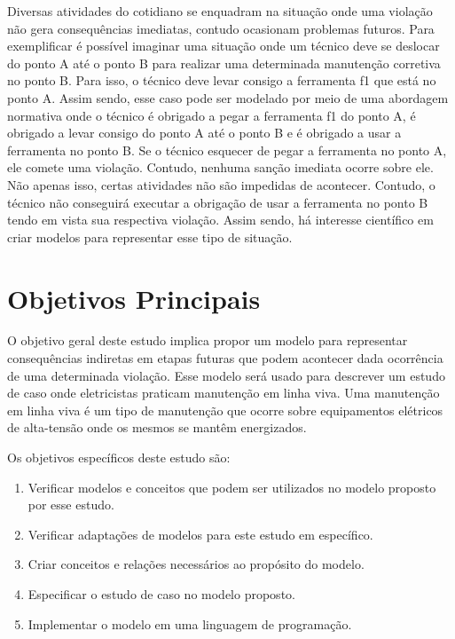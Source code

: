 \documentclass[a0,portrait]{a0poster}
\begin{document}
\begin{multicols}{2}
Diversas atividades do cotidiano se enquadram na situação onde uma violação não gera consequências
imediatas, contudo ocasionam problemas futuros. Para exemplificar é possível imaginar uma situação
onde um técnico deve se deslocar do ponto A até o ponto B para realizar uma determinada manutenção
corretiva no ponto B. Para isso, o técnico deve levar consigo a ferramenta f1 que está no ponto A. 
Assim sendo, esse caso pode ser modelado por meio de uma abordagem normativa onde o técnico é
obrigado a pegar a ferramenta f1 do ponto A, é obrigado a levar consigo do ponto A até o ponto B e
é obrigado a usar a ferramenta no ponto B. Se o técnico esquecer de pegar a ferramenta no ponto A,
ele comete uma violação. Contudo, nenhuma sanção imediata ocorre sobre ele. Não apenas isso, certas
atividades não são impedidas de acontecer. Contudo, o técnico não conseguirá executar a obrigação de 
usar a ferramenta no ponto B tendo em vista sua respectiva violação. Assim sendo, há interesse 
científico em criar modelos para representar esse tipo de situação.


\color{} %

\section*{Objetivos Principais}

O objetivo geral deste estudo implica propor um modelo para representar consequências indiretas em 
etapas futuras que podem acontecer dada ocorrência de uma determinada violação. Esse modelo 
será usado para descrever um estudo de caso onde eletricistas praticam manutenção em linha viva.
Uma manutenção em linha viva é um tipo de manutenção que ocorre sobre equipamentos elétricos de alta-tensão 
onde os mesmos se mantêm energizados. 

Os objetivos específicos deste estudo são:

\begin{enumerate}
\item Verificar modelos e conceitos que podem ser utilizados no modelo proposto por esse estudo.
\item Verificar adaptações de modelos para este estudo em específico.
\item Criar conceitos e relações necessários ao propósito do modelo. 
\item Especificar o estudo de caso no modelo proposto.
\item Implementar o modelo em uma linguagem de programação.
\end{enumerate}



\end{multicols}
\end{document}
